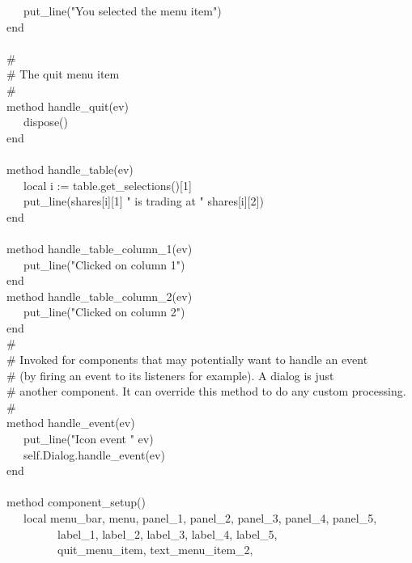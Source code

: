 {\>   \ \ \ put\_line("You selected the menu
item") \\
\>   end \\
\ \\
\>   \# \\
\>   \# The quit menu item \\
\>   \# \\
\>   method handle\_quit(ev) \\
\>   \ \ \ dispose() \\
\>   end \\
\ \\
\>   method handle\_table(ev) \\
\>   \ \ \ local i := table.get\_selections()[1] \\
\>   \ \ \ put\_line(shares[i][1] {\textbar}{\textbar} "
is trading at " {\textbar}{\textbar} shares[i][2]) \\
\>   end \\
\ \\
\>   method handle\_table\_column\_1(ev) \\
\>   \ \ \ put\_line("Clicked on column
1") \\
\>   end \\
\>   method handle\_table\_column\_2(ev) \\
\>   \ \ \ put\_line("Clicked on column
2") \\
\>   end
\ \\
\>   \# \\
\>   \# Invoked for components that may potentially want to handle an event\\
\>   \# (by firing an event to its listeners for example). A dialog is just\\
\>   \# another component. It can override this method to do any custom processing. \\
\>   \# \\
\>   method handle\_event(ev) \\
\>   \ \ \ put\_line("Icon event "
{\textbar}{\textbar} ev) \\
\>   \ \ \ self.Dialog.handle\_event(ev) \\
\>   end \\
\ \\
\>   method component\_setup() \\
\>   \ \ \ local menu\_bar, menu, panel\_1, panel\_2, panel\_3, panel\_4, panel\_5, \\
\>   \ \ \ \ \ \ \ \ \ label\_1, label\_2, label\_3, label\_4, label\_5, \\
\>   \ \ \ \ \ \ \ \ \ quit\_menu\_item, text\_menu\_item\_2, \\
}
